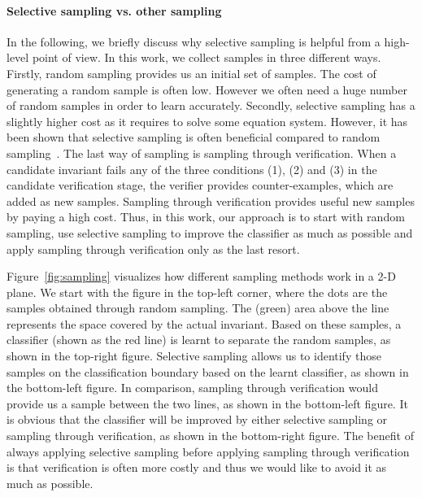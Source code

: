 \paragraph{Selective sampling vs. other sampling} In the following, we briefly discuss why selective sampling is helpful from a high-level point of view. In this work, we collect samples in three different ways. Firstly, random sampling provides us an initial set of samples. The cost of generating a random sample is often low. However we often need a huge number of random samples in order to learn accurately. Secondly, selective sampling has a slightly higher cost as it requires to solve some equation system. However, it has been shown that selective sampling is often beneficial compared to random sampling~\cite{DBLP:conf/mm/TongC01,DBLP:journals/jmlr/TongK01}. The last way of sampling is sampling through verification. When a candidate invariant fails any of the three conditions (1), (2) and (3) in the candidate verification stage, the verifier provides counter-examples, which are added as new samples. Sampling through verification provides useful new samples by paying a high cost. Thus, in this work, our approach is to start with random sampling, use selective sampling to improve the classifier as much as possible and apply sampling through verification only as the last resort.

Figure~\ref{fig:sampling} visualizes how different sampling methods work in a 2-D plane. We start with the figure in the top-left corner, where the dots are the samples obtained through random sampling. The (green) area above the line represents the space covered by the actual invariant. Based on these samples, a classifier (shown as the red line) is learnt to separate the random samples, as shown in the top-right figure. Selective sampling allows us to identify those samples on the classification boundary based on the learnt classifier, as shown in the bottom-left figure. In comparison, sampling through verification would provide us a sample between the two lines, as shown in the bottom-left figure. It is obvious that the classifier will be improved by either selective sampling or sampling through verification, as shown in the bottom-right figure. The benefit of always applying selective sampling before applying sampling through verification is that verification is often more costly and thus we would like to avoid it as much as possible.

